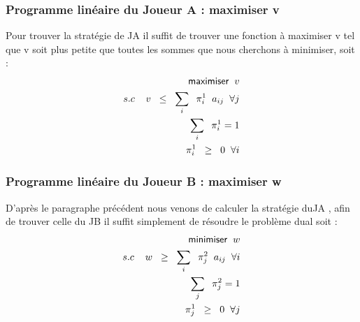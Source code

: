 \documentclass[a4paper, 12pt, twoside]{article}
\begin{document}
{{{\subsubsection{Programme linéaire du Joueur A : maximiser v}{Pour trouver la stratégie de JA il suffit de trouver une fonction à maximiser \textsf{v} tel que \textsf{v} soit plus petite que toutes les sommes que nous cherchons à minimiser, soit :}
\begin{align*}
\textsf{maximiser} \hspace{0,2 cm} v \\ 
 s.c \hspace{0.4 cm} v \hspace{0,2 cm}  \leq  \hspace{0.2 cm}\sum_{i}\hspace{0.2 cm} \pi_{i}^{1}\hspace{0.2 cm} a _{ij} \hspace{0,2 cm} \forall j\\
\sum_{i} \hspace{0.2 cm} \pi_{i}^{1} =1 \\ 
\pi_{i}^{1} \hspace{0,2 cm} \geq \hspace{0,2 cm} 0 \hspace{0,2 cm} \forall i 
\end{align*}

\subsubsection{Programme linéaire du Joueur B : maximiser w}{D'après le paragraphe précédent nous venons de calculer la stratégie du\textsf{JA} , afin de trouver celle du \textsf{JB} il suffit simplement de résoudre le problème dual soit :}
\begin{align*}
\textsf{minimiser} \hspace{0,2 cm} w \\ 
 s.c \hspace{0.4 cm} w \hspace{0,2 cm}  \geq  \hspace{0.2 cm}\sum_{i}\hspace{0.2 cm} \pi_{j}^{2}\hspace{0.2 cm} a _{ij} \hspace{0,2 cm} \forall i\\
\sum_{j} \hspace{0.2 cm} \pi_{j}^{2} =1 \\ 
\pi_{j}^{1} \hspace{0,2 cm} \geq \hspace{0,2 cm} 0 \hspace{0,2 cm} \forall j
\end{align*}




}}}
\end{document}
